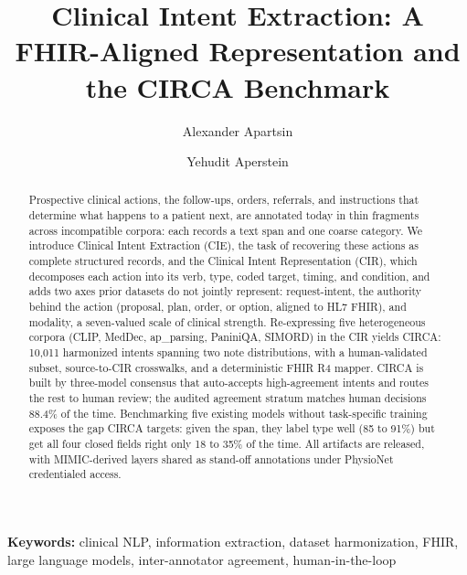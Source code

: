 \documentclass[3p,twocolumn]{elsarticle}
\begin{document}
\pagestyle{plain}
\thispagestyle{plain}
\flushbottom
\thispagestyle{plain}
\begin{frontmatter}
\title{Clinical Intent Extraction: A FHIR-Aligned Representation and the CIRCA Benchmark}

\author[a]{Alexander Apartsin}
\author[b]{Yehudit Aperstein}
\address[a]{Holon Institute of Technology, Holon, Israel}
\address[b]{Afeka College of Engineering, Tel Aviv, Israel}

\begin{abstract}
Prospective clinical actions, the follow-ups, orders, referrals, and instructions that determine what happens to a patient next, are annotated today in thin fragments across incompatible corpora: each records a text span and one coarse category. We introduce Clinical Intent Extraction (CIE), the task of recovering these actions as complete structured records, and the Clinical Intent Representation (CIR), which decomposes each action into its verb, type, coded target, timing, and condition, and adds two axes prior datasets do not jointly represent: request-intent, the authority behind the action (proposal, plan, order, or option, aligned to HL7 FHIR), and modality, a seven-valued scale of clinical strength. Re-expressing five heterogeneous corpora (CLIP, MedDec, ap\_parsing, PaniniQA, SIMORD) in the CIR yields CIRCA: 10,011 harmonized intents spanning two note distributions, with a human-validated subset, source-to-CIR crosswalks, and a deterministic FHIR R4 mapper. CIRCA is built by three-model consensus that auto-accepts high-agreement intents and routes the rest to human review; the audited agreement stratum matches human decisions 88.4\% of the time. Benchmarking five existing models without task-specific training exposes the gap CIRCA targets: given the span, they label type well (85 to 91\%) but get all four closed fields right only 18 to 35\% of the time. All artifacts are released, with MIMIC-derived layers shared as stand-off annotations under PhysioNet credentialed access.
\end{abstract}

\end{frontmatter}
\textbf{Keywords:} clinical NLP, information extraction, dataset harmonization, FHIR, large language models, inter-annotator agreement, human-in-the-loop
\end{document}
